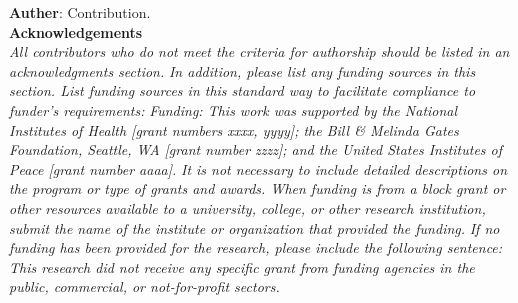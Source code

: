 \documentclass[11pt, letterpaper]{article}
\begin{document}
\noindent
\textbf{Auther}: Contribution. \\

\noindent
\textbf{Acknowledgements}\\





\noindent
\textit{All contributors who do not meet the criteria for authorship should be listed in an acknowledgments section.} 
\vskip 0.2cm
\noindent
\textit{In addition, please list any funding sources in this section. List funding sources in this standard way to facilitate compliance to funder's requirements:}
\vskip 0.2cm
\noindent
\textit{Funding: This work was supported by the National Institutes of Health [grant numbers xxxx, yyyy]; the Bill \& Melinda Gates Foundation, Seattle, WA [grant number zzzz]; and the United States Institutes of Peace [grant number aaaa].}
\vskip 0.2cm
\noindent
\textit{It is not necessary to include detailed descriptions on the program or type of grants and awards. When funding is from a block grant or other resources available to a university, college, or other research institution, submit the name of the institute or organization that provided the funding.}
\vskip 0.2cm
\noindent
\textit{If no funding has been provided for the research, please include the following sentence:}
\vskip 0.2cm
\noindent
\textit{This research did not receive any specific grant from funding agencies in the public, commercial, or not-for-profit sectors.
}\\


%
%


\end{document}
